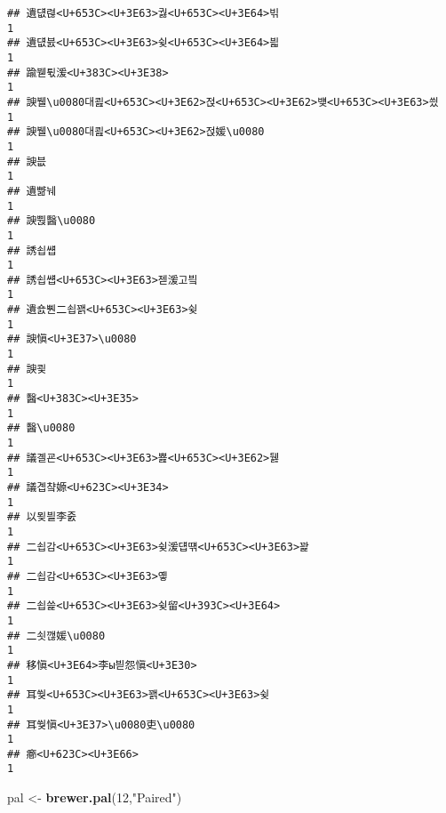 \documentclass[]{article}
\newenvironment{Shaded}{\begin{snugshade}}{\end{snugshade}}
\newcommand{\KeywordTok}[1]{\textcolor[rgb]{0.13,0.29,0.53}{\textbf{#1}}}
\newcommand{\DecValTok}[1]{\textcolor[rgb]{0.00,0.00,0.81}{#1}}
\newcommand{\StringTok}[1]{\textcolor[rgb]{0.31,0.60,0.02}{#1}}
\newcommand{\NormalTok}[1]{#1}
\begin{document}
\begin{verbatim}
## 遺덊렪<U+653C><U+3E63>궗<U+653C><U+3E64>빆                                                      1
## 遺덊븘<U+653C><U+3E63>슂<U+653C><U+3E64>븳                                                      1
## 踰붿튃湲<U+383C><U+3E38>                                                            1
## 諛뷀\u0080대쾶<U+653C><U+3E62>젅<U+653C><U+3E62>뱾<U+653C><U+3E63>씠                                        1
## 諛뷀\u0080대쾶<U+653C><U+3E62>젅媛\u0080                                            1
## 諛븞                                                                    1
## 遺뺢눼                                                                  1
## 諛뿭醫\u0080                                                            1
## 誘쇱썝                                                                  1
## 誘쇱썝<U+653C><U+3E63>젣湲고빀                                                      1
## 遺숈뿬二쇱꽭<U+653C><U+3E63>슂                                                      1
## 諛愼<U+3E37>\u0080                                                            1
## 諛쾿                                                                    1
## 醫<U+383C><U+3E35>                                                                  1
## 醫\u0080                                                                1
## 議곌굔<U+653C><U+3E63>뾾<U+653C><U+3E62>뒗                                                      1
## 議곕챸嫄<U+623C><U+3E34>                                                            1
## 以묒븰李줈                                                              1
## 二쇱감<U+653C><U+3E63>슂湲덉떆<U+653C><U+3E63>꽕                                                1
## 二쇱감<U+653C><U+3E63>옣                                                            1
## 二쇱쓽<U+653C><U+3E63>슂留<U+393C><U+3E64>                                                      1
## 二쇳깮媛\u0080                                                          1
## 移愼<U+3E64>李ы븯怨愼<U+3E30>                                                      1
## 耳쒖<U+653C><U+3E63>꽭<U+653C><U+3E63>슂                                                        1
## 耳쒖愼<U+3E37>\u0080吏\u0080                                                  1
## 癤<U+623C><U+3E66>                                                                  1
\end{verbatim}

\begin{Shaded}
\begin{Highlighting}[]
\NormalTok{pal <-}\StringTok{ }\KeywordTok{brewer.pal}\NormalTok{(}\DecValTok{12}\NormalTok{,}\StringTok{"Paired"}\NormalTok{)}
\end{Highlighting}
\end{Shaded}
\end{document}
